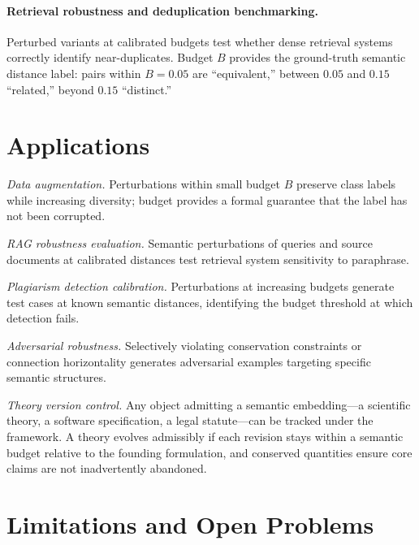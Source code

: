 \documentclass[12pt, a4paper]{article}
\theoremstyle{plain}
\theoremstyle{definition}
\theoremstyle{remark}
\begin{document}
\paragraph{Retrieval robustness and deduplication benchmarking.}
Perturbed variants at calibrated budgets test whether dense retrieval systems
correctly identify near-duplicates.  Budget $B$ provides the ground-truth
semantic distance label: pairs within $B = 0.05$ are ``equivalent,'' between
$0.05$ and $0.15$ ``related,'' beyond $0.15$ ``distinct.''


\section{Applications}
\label{sec:applications}

\emph{Data augmentation.}  Perturbations within small budget $B$ preserve class
labels while increasing diversity; budget provides a formal guarantee that the
label has not been corrupted.

\emph{RAG robustness evaluation.}  Semantic perturbations of queries and source
documents at calibrated distances test retrieval system sensitivity to paraphrase.

\emph{Plagiarism detection calibration.}  Perturbations at increasing budgets
generate test cases at known semantic distances, identifying the budget threshold
at which detection fails.

\emph{Adversarial robustness.}  Selectively violating conservation constraints
or connection horizontality generates adversarial examples targeting specific
semantic structures.

\emph{Theory version control.}  Any object admitting a semantic embedding---a
scientific theory, a software specification, a legal statute---can be tracked
under the framework.  A theory evolves admissibly if each revision stays within
a semantic budget relative to the founding formulation, and conserved quantities
ensure core claims are not inadvertently abandoned.


\section{Limitations and Open Problems}
\label{sec:limitations}
\end{document}
